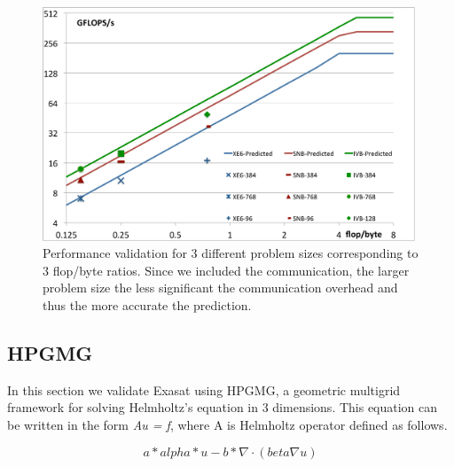 \documentclass{article}
\begin{document}
\begin{figure}[htp]
\centering
\includegraphics[width=0.99\textwidth]{jacobi_dram}
\caption{Performance validation for 3 different problem sizes corresponding to 3 flop/byte ratios. Since we included the communication, the larger problem size the less significant the communication overhead and thus the more accurate the prediction.}
\label{jacobi_dram}
\end{figure}




\subsection{HPGMG}
In this section we validate Exasat using HPGMG, a geometric multigrid framework for solving Helmholtz's equation in 3 dimensions.
This equation can be written in the form {\em Au = f}, where A is Helmholtz operator defined as follows.

\begin{equation}
a*alpha*u - b* \nabla \cdot (beta \nabla u)
\label{helmholtz}
\end{equation}
\end{document}
